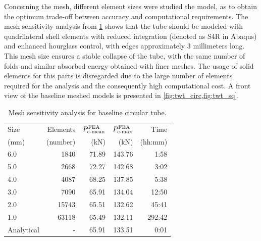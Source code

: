 \documentclass[12pt,number,preprint,review,times]{elsarticle}
\begin{document}
Concerning the mesh, different element sizes were studied the model, as to obtain the optimum trade-off between accuracy and computational requirements. The mesh sensitivity analysis from \cref{tab:mesh_sense} shows that the tube should be modeled with quadrilateral shell elements with reduced integration (denoted as S4R in Abaqus) and enhanced hourglass control, with edges approximately 3 millimeters long. This mesh size ensures a stable collapse of the tube, with the same number of folds and similar absorbed energy obtained with finer meshes. The usage of solid elements for this parts is disregarded due to the large number of elements required for the analysis and the consequently high computational cost. A front view of the baseline meshed models is presented in \cref{fig:twt_circ,fig:twt_sq}.


\begin{table}[!htpb]
\begin{center}
\begin{tabular}[t]{lrrrr} \toprule
Size & Elements & $P^{\mathrm{FEA}}_{\mathrm{c{\text -}mean}}$      &    $P^{\mathrm{FEA}}_{\mathrm{c{\text -}max}}$ & Time   \\
(mm) & (number) &   (kN)   &   (kN) & (hh:mm)  \\\midrule

6.0 & 1840 & 71.89  & 143.76 & 1:58    \\
5.0 & 2668 & 72.27  & 142.68 & 3:02  \\
4.0 & 4087 & 68.25  & 137.85 & 5:38 \\
3.0 & 7090 & 65.91  & 134.04 & 12:50 \\
2.0 & 15743 & 65.51 & 132.62 & 45:41 \\
1.0 & 63118 & 65.49 & 132.11 & 292:42  \\\midrule
Analytical & - & 65.91 & 133.51 & 0:01 \\
\bottomrule
\end{tabular}
\captionsetup{justification=centering}
\caption{Mesh sensitivity analysis for baseline circular tube.}
\label{tab:mesh_sense}
\end{center}
\end{table}
\end{document}
